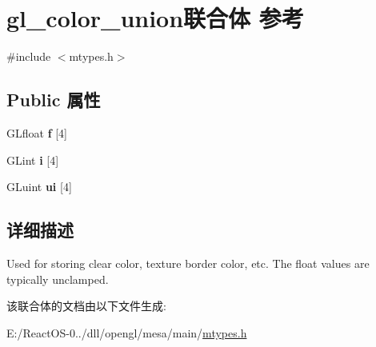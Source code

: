 \hypertarget{uniongl__color__union}{}\section{gl\+\_\+color\+\_\+union联合体 参考}
\label{uniongl__color__union}


{\ttfamily \#include $<$mtypes.\+h$>$}

\subsection*{Public 属性}
\begin{DoxyCompactItemize}
\item 
\mbox{\label{uniongl__color__union_a3d836fcd05fe79d5fd86ba889f0bbff0}} 
G\+Lfloat {\bfseries f} \mbox{[}4\mbox{]}
\item 
\mbox{\label{uniongl__color__union_acfab72fe2658c83d39c4b1f8f1556052}} 
G\+Lint {\bfseries i} \mbox{[}4\mbox{]}
\item 
\mbox{\label{uniongl__color__union_a6ca3c9cb4de3a5217f56d5ae04017404}} 
G\+Luint {\bfseries ui} \mbox{[}4\mbox{]}
\end{DoxyCompactItemize}


\subsection{详细描述}
Used for storing clear color, texture border color, etc. The float values are typically unclamped. 

该联合体的文档由以下文件生成\+:\begin{DoxyCompactItemize}
\item 
E\+:/\+React\+O\+S-\/0../dll/opengl/mesa/main/\hyperlink{mtypes_8h}{mtypes.\+h}\end{DoxyCompactItemize}
